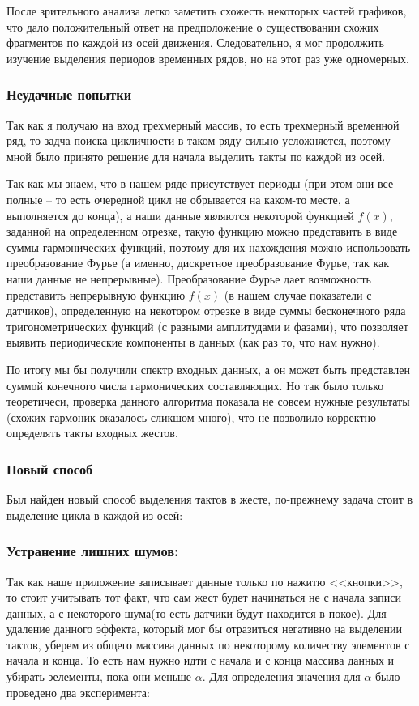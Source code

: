 После зрительного анализа легко заметить схожесть некоторых частей графиков, что дало положительный ответ на предположение о существовании схожих фрагментов по каждой из осей движения. Следовательно, я мог продолжить изучение выделения периодов временных рядов, но на этот раз уже одномерных.

\subsubsection{Неудачные попытки}

Так как я получаю на вход трехмерный массив, то есть трехмерный временной ряд, то задча поиска цикличности в таком ряду сильно усложняется, поэтому мной было принято решение для начала выделить такты по каждой из осей.

Так как мы знаем, что в нашем ряде присутствует периоды (при этом они все полные – то есть очередной цикл не обрывается на каком-то месте, а выполняется до конца), а наши данные являются некоторой функцией $f(x)$, заданной на определенном отрезке, такую функцию можно представить в виде суммы гармонических функций, поэтому для их нахождения можно использовать преобразование Фурье (а именно, дискретное преобразование Фурье, так как наши данные не непрерывные). Преобразование Фурье
дает возможность представить непрерывную функцию $f(x)$ (в нашем случае показатели с датчиков), определенную на некотором отрезке в виде суммы бесконечного ряда тригонометрических функций (с разными амплитудами и фазами), что позволяет выявить периодические компоненты в данных (как раз то, что нам нужно).

По итогу мы бы получили спектр входных данных, а он может быть представлен суммой конечного числа гармонических составляющих. Но так было только теоретичеси, проверка данного алгоритма показала не совсем нужные результаты (схожих гармоник оказалось сликшом много), что не позволило корректно определять такты входных жестов.

\subsubsection{Новый способ}
Был найден новый способ выделения тактов в жесте, по-прежнему задача стоит в выделение цикла в каждой из осей:
\subsubsection{Устранение лишних шумов:}
Так как наше приложение записывает данные только по нажитю <<кнопки>>, то стоит учитывать тот факт, что сам жест будет начинаться не с начала записи данных, а с некоторого шума(то есть датчики будут находится в покое). Для удаление данного эффекта, который мог бы отразиться негативно на выделении тактов, уберем из общего массива данных по некоторому количеству элементов с начала и конца. То есть нам нужно идти с начала и с конца массива данных и убирать эелементы, пока они меньше $\alpha$. Для определения значения для $\alpha$ было проведено два эксперимента:

